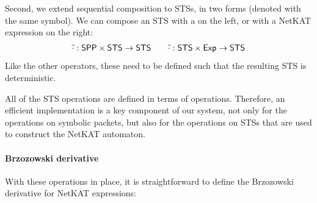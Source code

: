 \documentclass[acmsmall,dvipsnames,nonacm]{acmart}
\begin{document}
Second, we extend sequential composition to STSs, in two forms (denoted with the same symbol).
We can compose an STS with a \SPPn{} on the left, or with a NetKAT expression on the right:
\begin{align*}
    \tilde{\cdot} : \mathsf{SPP} \times \mathsf{STS} \to \mathsf{STS} \qquad
    \tilde{\cdot} : \mathsf{STS} \times \mathsf{Exp} \to \mathsf{STS}
\end{align*}
Like the other operators, these need to be defined such that the resulting STS is deterministic.

All of the STS operations are defined in terms of \SPPn{} operations.
Therefore, an efficient \SPPn{} implementation is a key component of our system,
not only for the operations on symbolic packets, but also for the operations on STSs that are used to construct the NetKAT automaton.

\paragraph{Brzozowski derivative}
With these operations in place, it is straightforward to define the Brzozowski derivative for NetKAT expressions:
\end{document}
